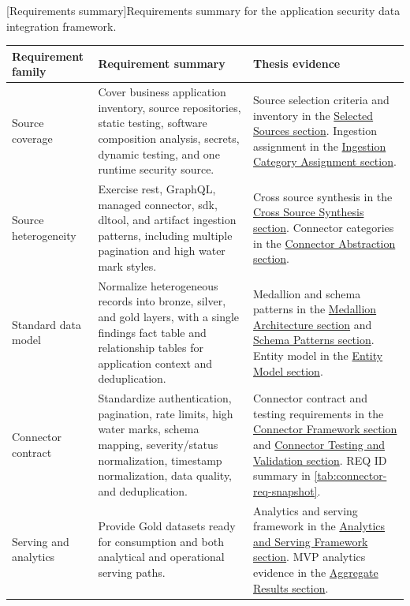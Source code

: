 \begin{center}
\begin{minipage}{\textwidth}
[Requirements summary]{Requirements summary for the application security data integration framework.}
\label{tab:req-summary}
\small
\begin{tabularx}{\textwidth}{l X X}
\toprule
\textbf{Requirement family} & \textbf{Requirement summary} & \textbf{Thesis evidence} \\
\midrule
Source coverage & Cover business application inventory, source repositories, static testing, software composition analysis, secrets, dynamic testing, and one runtime security source. & Source selection criteria and inventory in the \hyperref[sec:selected-sources]{Selected Sources section}. Ingestion assignment in the \hyperref[sec:ingestion-category-assignment]{Ingestion Category Assignment section}. \\
Source heterogeneity & Exercise \gls{rest}, GraphQL, managed connector, \gls{sdk}, \gls{dltool}, and artifact ingestion patterns, including multiple pagination and high water mark styles. & Cross source synthesis in the \hyperref[sec:cross-source-synthesis]{Cross Source Synthesis section}. Connector categories in the \hyperref[sec:connector-abstraction]{Connector Abstraction section}. \\
Standard data model & Normalize heterogeneous records into bronze, silver, and gold layers, with a single findings fact table and relationship tables for application context and deduplication. & Medallion and schema patterns in the \hyperref[sec:medallion-arch]{Medallion Architecture section} and \hyperref[sec:schema-patterns]{Schema Patterns section}. Entity model in the \hyperref[sec:entity-model]{Entity Model section}. \\
Connector contract & Standardize authentication, pagination, rate limits, high water marks, schema mapping, severity/status normalization, timestamp normalization, data quality, and deduplication. & Connector contract and testing requirements in the \hyperref[sec:connector-framework]{Connector Framework section} and \hyperref[sec:connector-testing]{Connector Testing and Validation section}. REQ ID summary in \autoref{tab:connector-req-snapshot}. \\
Serving and analytics & Provide Gold datasets ready for consumption and both analytical and operational serving paths. & Analytics and serving framework in the \hyperref[sec:analytics-serving]{Analytics and Serving Framework section}. MVP analytics evidence in the \hyperref[sec:impl-results]{Aggregate Results section}. \\

\end{tabularx}
\end{minipage}
\end{center}
